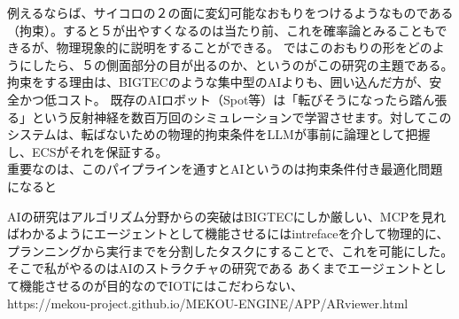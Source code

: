 \documentclass{article}
\begin{document}
    例えるならば、サイコロの２の面に変幻可能なおもりをつけるようなものである（拘束）。すると５が出やすくなるのは当たり前、これを確率論とみることもできるが、物理現象的に説明をすることができる。
    ではこのおもりの形をどのようにしたら、５の側面部分の目が出るのか、というのがこの研究の主題である。
    拘束をする理由は、BIGTECのような集中型のAIよりも、囲い込んだ方が、安全かつ低コスト。
    既存のAIロボット（Spot等）は「転びそうになったら踏ん張る」という反射神経を数百万回のシミュレーションで学習させます。対してこのシステムは、転ばないための物理的拘束条件をLLMが事前に論理として把握し、ECSがそれを保証する。 \\

    重要なのは、このパイプラインを通すとAIというのは拘束条件付き最適化問題になると

AIの研究はアルゴリズム分野からの突破はBIGTECにしか厳しい、MCPを見ればわかるようにエージェントとして機能させるにはintrefaceを介して物理的に、プランニングから実行までを分割したタスクにすることで、これを可能にした。そこで私がやるのはAIのストラクチャの研究である
あくまでエージェントとして機能させるのが目的なのでIOTにはこだわらない、\\
https://mekou-project.github.io/MEKOU-ENGINE/APP/ARviewer.html  
\end{document}
